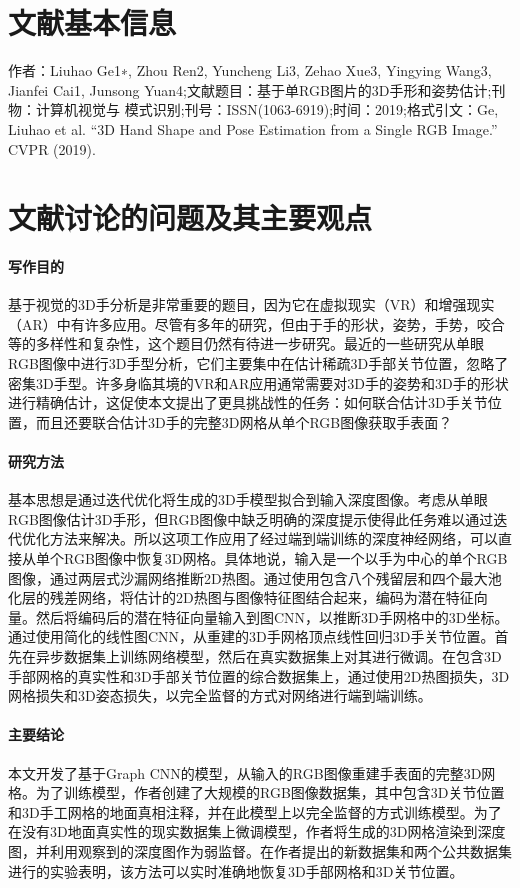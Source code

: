 \documentclass[a4paper,12pt,onecolumn,songti]{article}
\begin{document}
 
	\section{文献基本信息}
	作者：Liuhao Ge1∗, Zhou Ren2, Yuncheng Li3, Zehao Xue3, Yingying Wang3, Jianfei Cai1, Junsong Yuan4;文献题目：基于单RGB图片的3D手形和姿势估计;刊物：计算机视觉与	模式识别;刊号：ISSN(1063-6919);时间：2019;格式引文：Ge, Liuhao et al. “3D Hand Shape and Pose Estimation from a Single RGB Image.” CVPR (2019).
	\section{文献讨论的问题及其主要观点}
		\paragraph{写作目的}
		基于视觉的3D手分析是非常重要的题目，因为它在虚拟现实（VR）和增强现实（AR）中有许多应用。尽管有多年的研究，但由于手的形状，姿势，手势，咬合等的多样性和复杂性，这个题目仍然有待进一步研究。最近的一些研究从单眼RGB图像中进行3D手型分析，它们主要集中在估计稀疏3D手部关节位置，忽略了密集3D手型。许多身临其境的VR和AR应用通常需要对3D手的姿势和3D手的形状进行精确估计，这促使本文提出了更具挑战性的任务：如何联合估计3D手关节位置，而且还要联合估计3D手的完整3D网格从单个RGB图像获取手表面？
		\paragraph{研究方法}
		基本思想是通过迭代优化将生成的3D手模型拟合到输入深度图像。考虑从单眼RGB图像估计3D手形，但RGB图像中缺乏明确的深度提示使得此任务难以通过迭代优化方法来解决。所以这项工作应用了经过端到端训练的深度神经网络，可以直接从单个RGB图像中恢复3D网格。具体地说，输入是一个以手为中心的单个RGB图像，通过两层式沙漏网络推断2D热图。通过使用包含八个残留层和四个最大池化层的残差网络，将估计的2D热图与图像特征图结合起来，编码为潜在特征向量。然后将编码后的潜在特征向量输入到图CNN，以推断3D手网格中的3D坐标。通过使用简化的线性图CNN，从重建的3D手网格顶点线性回归3D手关节位置。首先在异步数据集上训练网络模型，然后在真实数据集上对其进行微调。在包含3D手部网格的真实性和3D手部关节位置的综合数据集上，通过使用2D热图损失，3D网格损失和3D姿态损失，以完全监督的方式对网络进行端到端训练。
		\paragraph{主要结论}
		本文开发了基于Graph CNN的模型，从输入的RGB图像重建手表面的完整3D网格。为了训练模型，作者创建了大规模的RGB图像数据集，其中包含3D关节位置和3D手工网格的地面真相注释，并在此模型上以完全监督的方式训练模型。为了在没有3D地面真实性的现实数据集上微调模型，作者将生成的3D网格渲染到深度图，并利用观察到的深度图作为弱监督。在作者提出的新数据集和两个公共数据集进行的实验表明，该方法可以实时准确地恢复3D手部网格和3D关节位置。
\end{document}
